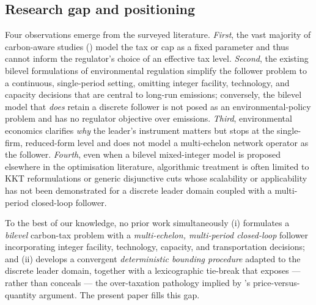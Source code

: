 \subsection{Research gap and positioning}
\label{sec:lit:gap}

Four observations emerge from the surveyed literature.
\emph{First}, the vast majority of carbon-aware \SCND studies
() model the tax or cap as a fixed parameter and thus
cannot inform the regulator's choice of an effective tax level.
\emph{Second}, the existing bilevel formulations of environmental
regulation \citep{zhang2021, he2019, cao2020} simplify the follower
problem to a continuous, single-period setting, omitting integer
facility, technology, and capacity decisions that are central to
long-run emissions; conversely, the bilevel \SCND model that
\emph{does} retain a discrete follower \citep{yueyou2017} is not
posed as an environmental-policy problem and has no regulator
objective over emissions. \emph{Third}, environmental economics
clarifies \emph{why} the leader's instrument matters
\citep{weitzman1974, newellpizer2003, aldy2010} but stops at the
single-firm, reduced-form level and does not model a multi-echelon
network operator as the follower. \emph{Fourth}, even when a bilevel
mixed-integer model is proposed elsewhere in the optimisation
literature, algorithmic treatment is often limited to KKT
reformulations or generic disjunctive cuts
\citep{fortuny1981,fischetti2017,kleinert2021} whose scalability or
applicability has not been demonstrated for a discrete leader domain
coupled with a multi-period closed-loop follower.

To the best of our knowledge, no prior work simultaneously
(i) formulates a \emph{bilevel} carbon-tax problem with a
\emph{multi-echelon, multi-period closed-loop} \SCND follower
incorporating integer facility, technology, capacity, and
transportation decisions; and (ii) develops a convergent
\emph{deterministic bounding procedure} adapted to the discrete
leader domain, together with a lexicographic tie-break that exposes
--- rather than conceals --- the over-taxation pathology implied by
\citet{weitzman1974}'s price-versus-quantity argument. The present
paper fills this gap.
